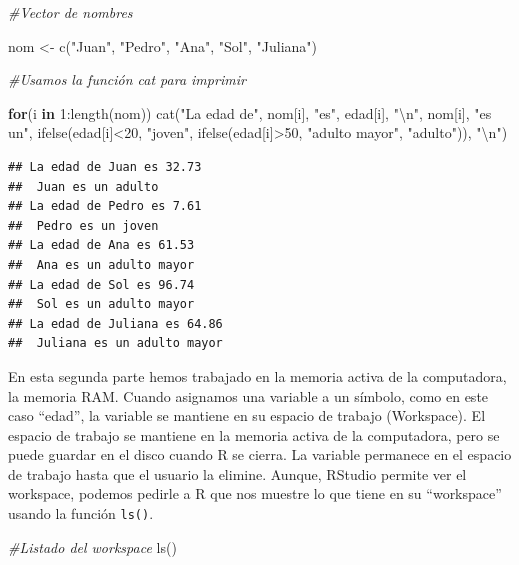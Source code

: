 \documentclass[
]{article}
\newenvironment{Shaded}{\begin{snugshade}}{\end{snugshade}}
\newcommand{\CommentTok}[1]{\textcolor[rgb]{0.56,0.35,0.01}{\textit{#1}}}
\newcommand{\ControlFlowTok}[1]{\textcolor[rgb]{0.13,0.29,0.53}{\textbf{#1}}}
\newcommand{\DecValTok}[1]{\textcolor[rgb]{0.00,0.00,0.81}{#1}}
\newcommand{\FunctionTok}[1]{\textcolor[rgb]{0.00,0.00,0.00}{#1}}
\newcommand{\NormalTok}[1]{#1}
\newcommand{\OtherTok}[1]{\textcolor[rgb]{0.56,0.35,0.01}{#1}}
\newcommand{\SpecialCharTok}[1]{\textcolor[rgb]{0.00,0.00,0.00}{#1}}
\newcommand{\StringTok}[1]{\textcolor[rgb]{0.31,0.60,0.02}{#1}}
\begin{document}
\begin{Shaded}
\begin{Highlighting}[]
\CommentTok{\#Vector de nombres}

\NormalTok{nom }\OtherTok{\textless{}{-}} \FunctionTok{c}\NormalTok{(}\StringTok{"Juan"}\NormalTok{, }\StringTok{"Pedro"}\NormalTok{, }\StringTok{"Ana"}\NormalTok{, }\StringTok{"Sol"}\NormalTok{, }\StringTok{"Juliana"}\NormalTok{)}

\CommentTok{\#Usamos la función cat para imprimir}

\ControlFlowTok{for}\NormalTok{(i }\ControlFlowTok{in} \DecValTok{1}\SpecialCharTok{:}\FunctionTok{length}\NormalTok{(nom)) }\FunctionTok{cat}\NormalTok{(}\StringTok{"La edad de"}\NormalTok{, nom[i], }\StringTok{"es"}\NormalTok{, edad[i], }\StringTok{"}\SpecialCharTok{\textbackslash{}n}\StringTok{"}\NormalTok{,}
\NormalTok{                            nom[i], }\StringTok{"es un"}\NormalTok{, }\FunctionTok{ifelse}\NormalTok{(edad[i]}\SpecialCharTok{\textless{}}\DecValTok{20}\NormalTok{, }\StringTok{"joven"}\NormalTok{, }
                                               \FunctionTok{ifelse}\NormalTok{(edad[i]}\SpecialCharTok{\textgreater{}}\DecValTok{50}\NormalTok{, }\StringTok{"adulto mayor"}\NormalTok{, }\StringTok{"adulto"}\NormalTok{)), }\StringTok{"}\SpecialCharTok{\textbackslash{}n}\StringTok{"}\NormalTok{)}
\end{Highlighting}
\end{Shaded}

\begin{verbatim}
## La edad de Juan es 32.73 
##  Juan es un adulto 
## La edad de Pedro es 7.61 
##  Pedro es un joven 
## La edad de Ana es 61.53 
##  Ana es un adulto mayor 
## La edad de Sol es 96.74 
##  Sol es un adulto mayor 
## La edad de Juliana es 64.86 
##  Juliana es un adulto mayor
\end{verbatim}

En esta segunda parte hemos trabajado en la memoria activa de la
computadora, la memoria RAM. Cuando asignamos una variable a un símbolo,
como en este caso ``edad'', la variable se mantiene en su espacio de
trabajo (Workspace). El espacio de trabajo se mantiene en la memoria
activa de la computadora, pero se puede guardar en el disco cuando R se
cierra. La variable permanece en el espacio de trabajo hasta que el
usuario la elimine. Aunque, RStudio permite ver el workspace, podemos
pedirle a R que nos muestre lo que tiene en su ``workspace'' usando la
función \texttt{ls()}.

\begin{Shaded}
\begin{Highlighting}[]
\CommentTok{\#Listado del workspace}
\FunctionTok{ls}\NormalTok{()}
\end{Highlighting}
\end{Shaded}
\end{document}
